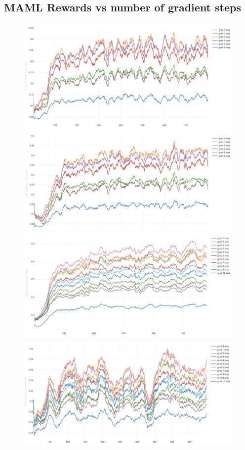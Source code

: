 \documentclass{article} %
\begin{document}
\subsection{MAML Rewards vs number of gradient steps} 
\begin{figure}[H]
\label{curves}
\begin{center}
\includegraphics[scale=0.16]{bradly_curves/emaml-5-0.png}%
\includegraphics[scale=0.16]{bradly_curves/maml-5-0.png}
\includegraphics[scale=0.16]{bradly_curves/emaml-10-0.png}%
\includegraphics[scale=0.16]{bradly_curves/maml-10-0.png}

\end{center}
\end{figure}
\end{document}
